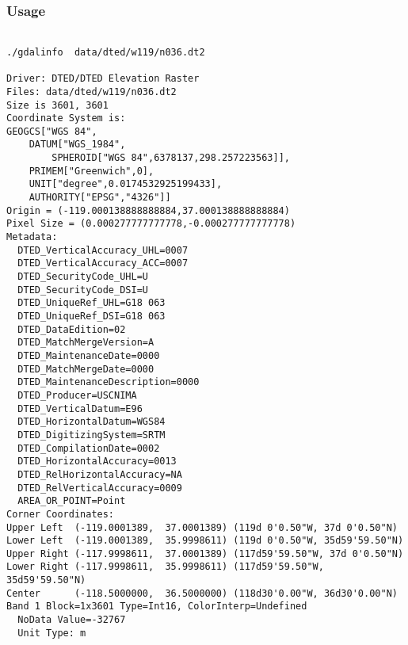 \subsubsection*{Usage}
\begin{verbatim}

./gdalinfo  data/dted/w119/n036.dt2

Driver: DTED/DTED Elevation Raster
Files: data/dted/w119/n036.dt2
Size is 3601, 3601
Coordinate System is:
GEOGCS["WGS 84",
    DATUM["WGS_1984",
        SPHEROID["WGS 84",6378137,298.257223563]],
    PRIMEM["Greenwich",0],
    UNIT["degree",0.0174532925199433],
    AUTHORITY["EPSG","4326"]]
Origin = (-119.000138888888884,37.000138888888884)
Pixel Size = (0.000277777777778,-0.000277777777778)
Metadata:
  DTED_VerticalAccuracy_UHL=0007
  DTED_VerticalAccuracy_ACC=0007
  DTED_SecurityCode_UHL=U  
  DTED_SecurityCode_DSI=U
  DTED_UniqueRef_UHL=G18 063     
  DTED_UniqueRef_DSI=G18 063        
  DTED_DataEdition=02
  DTED_MatchMergeVersion=A
  DTED_MaintenanceDate=0000
  DTED_MatchMergeDate=0000
  DTED_MaintenanceDescription=0000
  DTED_Producer=USCNIMA 
  DTED_VerticalDatum=E96
  DTED_HorizontalDatum=WGS84
  DTED_DigitizingSystem=SRTM      
  DTED_CompilationDate=0002
  DTED_HorizontalAccuracy=0013
  DTED_RelHorizontalAccuracy=NA  
  DTED_RelVerticalAccuracy=0009
  AREA_OR_POINT=Point
Corner Coordinates:
Upper Left  (-119.0001389,  37.0001389) (119d 0'0.50"W, 37d 0'0.50"N)
Lower Left  (-119.0001389,  35.9998611) (119d 0'0.50"W, 35d59'59.50"N)
Upper Right (-117.9998611,  37.0001389) (117d59'59.50"W, 37d 0'0.50"N)
Lower Right (-117.9998611,  35.9998611) (117d59'59.50"W, 35d59'59.50"N)
Center      (-118.5000000,  36.5000000) (118d30'0.00"W, 36d30'0.00"N)
Band 1 Block=1x3601 Type=Int16, ColorInterp=Undefined
  NoData Value=-32767
  Unit Type: m

\end{verbatim}

